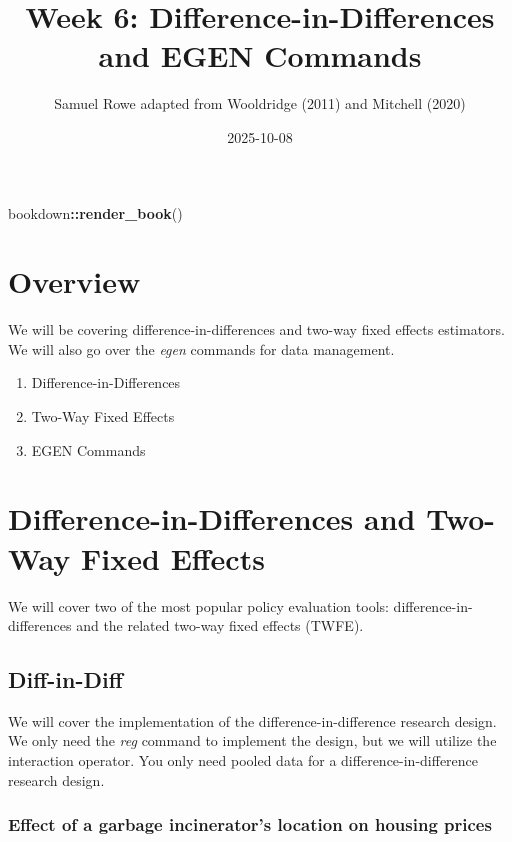 \documentclass[
]{book}
\title{Week 6: Difference-in-Differences and EGEN Commands}
\author{Samuel Rowe adapted from Wooldridge (2011) and Mitchell (2020)}
\date{2025-10-08}
\newenvironment{Shaded}{\begin{snugshade}}{\end{snugshade}}
\newcommand{\FunctionTok}[1]{\textcolor[rgb]{0.13,0.29,0.53}{\textbf{#1}}}
\newcommand{\NormalTok}[1]{#1}
\newcommand{\SpecialCharTok}[1]{\textcolor[rgb]{0.81,0.36,0.00}{\textbf{#1}}}
\providecommand{\tightlist}{%
  \setlength{\itemsep}{0pt}\setlength{\parskip}{0pt}}
\begin{document}
\maketitle

{
\setcounter{tocdepth}{1}
\tableofcontents
}
\begin{Shaded}
\begin{Highlighting}[]
\NormalTok{bookdown}\SpecialCharTok{::}\FunctionTok{render\_book}\NormalTok{()}
\end{Highlighting}
\end{Shaded}

\chapter{Overview}\label{overview}

We will be covering difference-in-differences and two-way fixed effects estimators. We will also go over the \emph{egen} commands for data management.

\begin{enumerate}
\def\labelenumi{\arabic{enumi}.}
\tightlist
\item
  Difference-in-Differences
\item
  Two-Way Fixed Effects
\item
  EGEN Commands
\end{enumerate}

\chapter{Difference-in-Differences and Two-Way Fixed Effects}\label{difference-in-differences-and-two-way-fixed-effects}

We will cover two of the most popular policy evaluation tools: difference-in-differences and the related two-way fixed effects (TWFE).

\section{Diff-in-Diff}\label{diff-in-diff}

We will cover the implementation of the difference-in-difference research design. We only need the \emph{reg} command to implement the design, but we will utilize the interaction operator. You only need pooled data for a difference-in-difference research design.

\subsection{Effect of a garbage incinerator's location on housing prices}\label{effect-of-a-garbage-incinerators-location-on-housing-prices}
\end{document}
